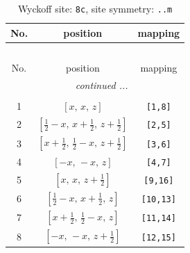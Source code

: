 \documentclass[fleqn,8pt]{jsarticle}
\begin{document}
\renewcommand{\arraystretch}{1.2}
\begin{longtable}{ccc}
\caption{Wyckoff site: {\tt 8c}, site symmetry: {\tt ..m}}
 \\
 \hline \hline
No. & position & mapping \\ \hline \endfirsthead

\multicolumn{2}{l}{\tablename\ \thetable{}} \\
 \hline \hline
No. & position & mapping \\ \hline \endhead

 \hline \hline
\multicolumn{2}{r}{\footnotesize\it continued ...} \\ \endfoot

 \hline \hline
\multicolumn{2}{r}{} \\ \endlastfoot

1 & $\left[ x,\, x,\, z \right]$ & {\tt [1,8]} \\ \hline
2 & $\left[ \frac{1}{2} - x,\, x + \frac{1}{2},\, z + \frac{1}{2} \right]$ & {\tt [2,5]} \\ \hline
3 & $\left[ x + \frac{1}{2},\, \frac{1}{2} - x,\, z + \frac{1}{2} \right]$ & {\tt [3,6]} \\ \hline
4 & $\left[ - x,\, - x,\, z \right]$ & {\tt [4,7]} \\ \hline
5 & $\left[ x,\, x,\, z + \frac{1}{2} \right]$ & {\tt [9,16]} \\ \hline
6 & $\left[ \frac{1}{2} - x,\, x + \frac{1}{2},\, z \right]$ & {\tt [10,13]} \\ \hline
7 & $\left[ x + \frac{1}{2},\, \frac{1}{2} - x,\, z \right]$ & {\tt [11,14]} \\ \hline
8 & $\left[ - x,\, - x,\, z + \frac{1}{2} \right]$ & {\tt [12,15]} \\
\end{longtable}
\renewcommand{\arraystretch}{1.2}
\end{document}
